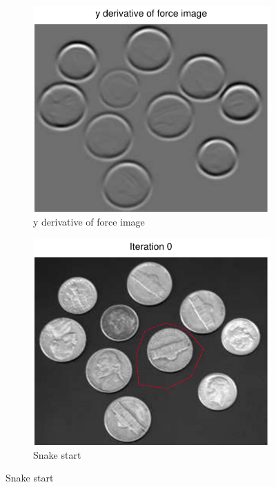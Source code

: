 \documentclass[11pt,a4paper]{article}
\begin{document}
\begin{figure}[H]
    \begin{subfigure}[t]{0.24\textwidth}
        \includegraphics[width=\textwidth]{src/images/coins_gradient_yforces.pdf}
        \caption{y derivative of force image}
        \label{fig:coins_fy}
    \end{subfigure}
    \begin{subfigure}[t]{0.24\textwidth}
        \includegraphics[width=\textwidth]{src/images/coins_gradient_0.pdf}
        \caption{Snake start}

\end{subfigure}
\end{figure}
\end{document}
